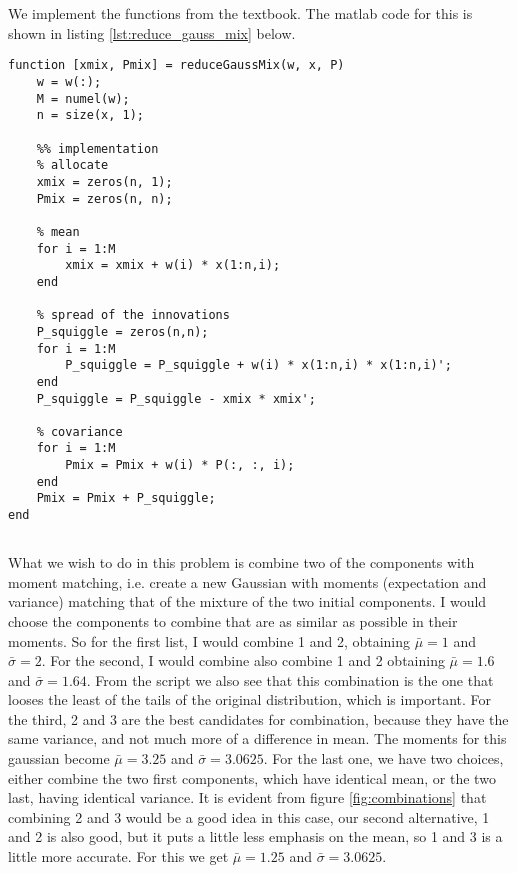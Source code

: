\documentclass[]{article}
\title{}
\author{Sigurd Totland | MTTK}
\begin{document}
\maketitle

\section{}
\subsection{}
We implement the functions from the textbook. The matlab code for this is shown in listing \ref{lst:reduce_gauss_mix} below.
\begin{lstlisting}[label={lst:reduce_gauss_mix}, caption={reduceGaussMix.m}]
function [xmix, Pmix] = reduceGaussMix(w, x, P)
    w = w(:);
    M = numel(w);
    n = size(x, 1);

    %% implementation
    % allocate
    xmix = zeros(n, 1);
    Pmix = zeros(n, n);

    % mean
    for i = 1:M
        xmix = xmix + w(i) * x(1:n,i);
    end

    % spread of the innovations
    P_squiggle = zeros(n,n);
    for i = 1:M
        P_squiggle = P_squiggle + w(i) * x(1:n,i) * x(1:n,i)';
    end
    P_squiggle = P_squiggle - xmix * xmix';

    % covariance
    for i = 1:M
        Pmix = Pmix + w(i) * P(:, :, i);
    end
    Pmix = Pmix + P_squiggle;
end
\end{lstlisting}

\subsection{}
What we wish to do in this problem is combine two of the components with moment matching, i.e. create a new Gaussian with moments (expectation and variance) matching that of the mixture of the two initial components. I would choose the components to combine that are as similar as possible in their moments. So for the first list, I would combine 1 and 2, obtaining $\bar \mu = 1$ and $\bar \sigma = 2$. For the second, I would combine also combine 1 and 2 obtaining $\bar \mu = 1.6$ and $\bar \sigma = 1.64$. From the script we also see that this combination is the one that looses the least of the tails of the original distribution, which is important. For the third, 2 and 3 are the best candidates for combination, because they have the same variance, and not much more of a difference in mean. The moments for this gaussian become $\bar \mu = 3.25$ and $\bar \sigma = 3.0625$. For the last one, we have two choices, either combine the two first components, which have identical mean, or the two last, having identical variance. It is evident from figure \ref{fig:combinations} that combining 2 and 3 would be a good idea in this case, our second alternative, 1 and 2 is also good, but it puts a little less emphasis on the mean, so 1 and 3 is a little more accurate. For this we get $\bar \mu = 1.25$ and $\bar \sigma = 3.0625$.
\end{document}
